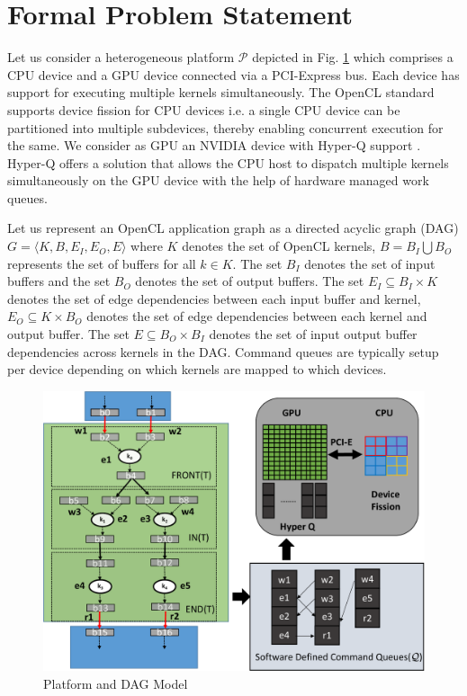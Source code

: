 \section{Formal Problem Statement}
\label{sec:prob}
	Let us consider a heterogeneous platform $\mathcal{P}$ depicted in Fig. \ref{fig:platprob} which comprises a CPU device and a GPU device connected via a PCI-Express bus. Each device has support for executing multiple kernels simultaneously. The OpenCL standard supports device fission for CPU devices i.e. a single CPU device can be partitioned into multiple subdevices, thereby enabling concurrent execution for the same. We consider as GPU an NVIDIA device with Hyper-Q support \cite{nvidia}. Hyper-Q offers a solution that allows the CPU host to dispatch multiple kernels simultaneously on the GPU device with the help of hardware managed work queues. 
	\par Let us represent an OpenCL application graph as a directed acyclic graph (DAG) $G = \langle K,B,E_I,E_O,E \rangle$ where $K$ denotes the set of OpenCL kernels, $B= B_I \bigcup B_O$ represents the set of buffers for all $k \in K$. The set $B_I$ denotes the set  of input buffers and the set $B_O$ denotes the set of output buffers. The set $E_I \subseteq B_I \times K$ denotes the set of edge dependencies between each input buffer and kernel, $E_O \subseteq K \times B_O$ denotes the set of edge dependencies between each kernel and output buffer. The set $E \subseteq B_O \times B_I$ denotes the set of input output buffer dependencies across kernels in the DAG. Command queues are typically setup per device depending on which kernels are mapped to which devices. 
	\begin{figure}[ht]
		\centering
		\includegraphics[scale=0.38]{Pictures/PlatformAndProblemFormulation.pdf}
		\caption{\small Platform and DAG Model\label{fig:platprob}}
	\end{figure}
